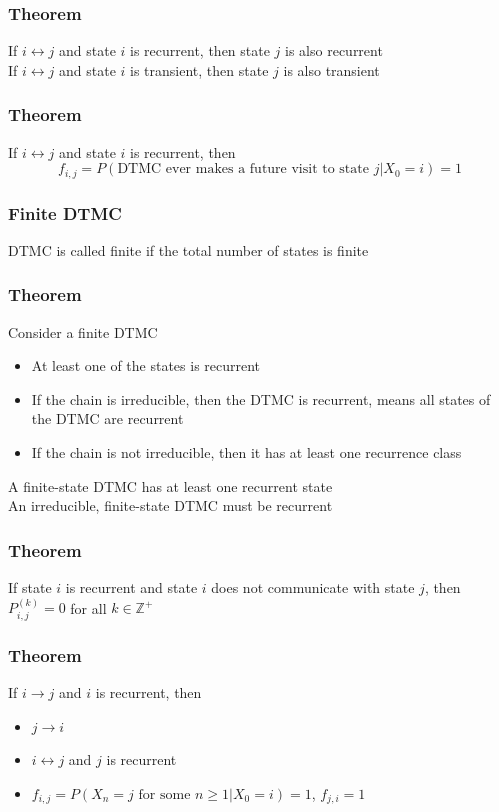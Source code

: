 \documentclass[11pt]{article}
\newcommand{\Z}{{\mathbb{Z}}}
\begin{document}
\subsubsection*{Theorem}
If $i\leftrightarrow j$ and state $i$ is recurrent, then state $j$ is also recurrent \\
If $i\leftrightarrow j$ and state $i$ is transient, then state $j$ is also transient
\subsubsection*{Theorem}
If $i\leftrightarrow j$ and state $i$ is recurrent, then 
\[f_{i,j} = P(\text{DTMC ever makes a future visit to state } j|X_0=i)=1\] 
\subsubsection*{Finite DTMC}
DTMC is called finite if the total number of states is finite 
\subsubsection*{Theorem}
Consider a finite DTMC 
\begin{itemize}
    \item At least one of the states is recurrent 
    \item If the chain is irreducible, then the DTMC is recurrent, means all states of the DTMC are recurrent 
    \item If the chain is not irreducible, then it has at least one recurrence class 
\end{itemize}
A finite-state DTMC has at least one recurrent state \\
An irreducible, finite-state DTMC must be recurrent 
\subsubsection*{Theorem}
If state $i$ is recurrent and state $i$ does not communicate with state $j$, then $P_{i,j}^{(k)}=0$ for all $k\in\Z^+$ 
\subsubsection*{Theorem}
If $i\to j$ and $i$ is recurrent, then 
\begin{itemize}
    \item $j\to i$
    \item $i\leftrightarrow j$ and $j$ is recurrent 
    \item $f_{i,j} = P(X_n=j\text{ for some }n\geq 1|X_0=i) = 1$, $f_{j,i} = 1$
\end{itemize}
\end{document}

